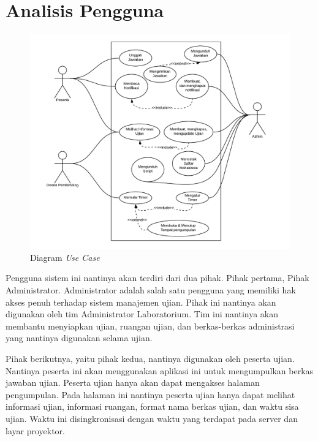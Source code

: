 \section{Analisis Pengguna}

\begin{figure}
    \centering
    \includegraphics[width=0.75\paperwidth]{Gambar/diagram-usecase.pdf}
    \caption{Diagram \textit{Use Case}}
    \label{fig:my_label}
\end{figure}

Pengguna sistem ini nantinya akan terdiri dari dua pihak. Pihak pertama, Pihak
Administrator. Administrator adalah salah satu pengguna yang memiliki hak akses
penuh terhadap sistem manajemen ujian. Pihak ini nantinya akan digunakan oleh
tim Administrator Laboratorium. Tim ini nantinya akan membantu menyiapkan ujian,
ruangan ujian, dan berkas-berkas administrasi yang nantinya digunakan selama
ujian.

Pihak berikutnya, yaitu pihak kedua, nantinya digunakan oleh peserta ujian.
Nantinya peserta ini akan menggunakan aplikasi ini untuk mengumpulkan berkas
jawaban ujian. Peserta ujian hanya akan dapat mengakses halaman pengumpulan.
Pada halaman ini nantinya peserta ujian hanya dapat melihat informasi ujian,
informasi ruangan, format nama berkas ujian, dan waktu sisa ujian. Waktu ini
disingkronisasi dengan waktu yang terdapat pada server dan layar proyektor.